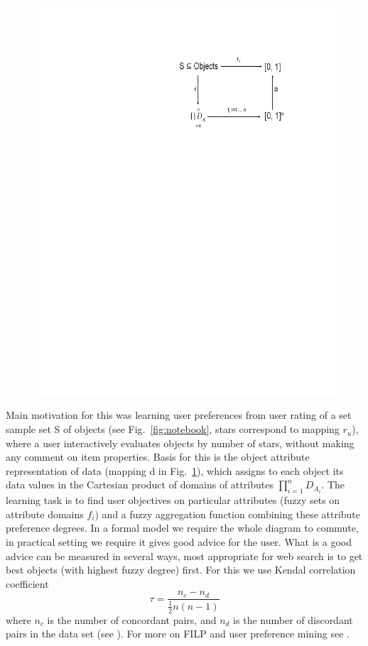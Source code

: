 \begin{figure}[ht]
\begin{minipage}[b]{0.5\hsize}
		\includegraphics[width=\hsize]{img/aggregation}
\caption{}
\label{fig:aggregation}
\end{minipage}
\end{figure}

     Main motivation for this was learning user preferences from user rating of a set sample set S of objects (see Fig.~\ref{fig:notebook}, stars correspond to mapping $r_u$), where a user interactively evaluates objects by number of stars, without making any comment on item properties. Basis for this is the object attribute representation of data (mapping d in Fig.~\ref{fig:aggregation}), which assigns to each object its data values in the Cartesian product of domains of attributes $\prod_{i=1}^{n}D_{A_{i}}$. The learning task is to find user objectives on particular attributes (fuzzy sets on attribute domains $f_i$) and a fuzzy aggregation function combining these attribute preference degrees. In a formal model we require the whole diagram to commute, in practical setting we require it gives good advice for the user. What is a good advice can be measured in several ways, most appropriate for web search is to get best objects (with highest fuzzy degree) first. For this we use Kendal correlation coefficient
\begin{displaymath}
\tau = \frac{n_c - n_d}{\frac{1}{2}n(n-1)}
\end{displaymath} 
where $n_c$ is the number of concordant pairs, and $n_d$ is the number of discordant pairs in the data set (see \cite{KW}). For more on FILP and user preference mining see \cite{24, 26}.

